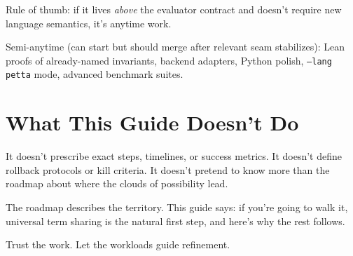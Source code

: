 \documentclass[11pt]{article}
\newcommand{\code}[1]{\texttt{#1}}
\begin{document}
Rule of thumb: if it lives \emph{above} the evaluator contract and
doesn't require new language semantics, it's anytime work.

Semi-anytime (can start but should merge after relevant seam stabilizes):
Lean proofs of already-named invariants, backend adapters, Python polish,
\code{--lang petta} mode, advanced benchmark suites.

\section{What This Guide Doesn't Do}

It doesn't prescribe exact steps, timelines, or success metrics.
It doesn't define rollback protocols or kill criteria.  It doesn't
pretend to know more than the roadmap about where the clouds of
possibility lead.

The roadmap describes the territory.  This guide says: if you're
going to walk it, universal term sharing is the natural first step,
and here's why the rest follows.

Trust the work.  Let the workloads guide refinement.
\end{document}
